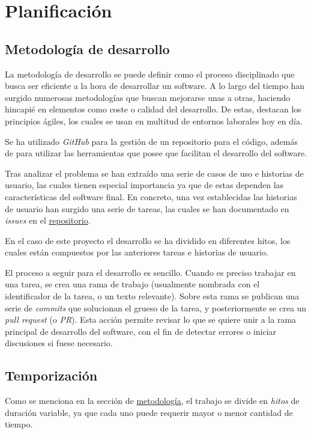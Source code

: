 \chapter{Planificación}

\section{Metodología de desarrollo}
\label{sec:metodologia}

La metodología de desarrollo se puede definir como el proceso disciplinado que busca ser eficiente a la hora de desarrollar un software. A lo largo del tiempo han surgido numerosas metodologías que buscan mejorarse unas a otras, haciendo hincapié en elementos como coste o calidad del desarrollo. De estas, destacan los principios ágiles, los cuales se usan en multitud de entornos laborales hoy en día.

Se ha utilizado \textit{GitHub} para la gestión de un repositorio para el código, además de para utilizar las herramientas que posee que facilitan el desarrollo del software.

Tras analizar el problema se han extraído una serie de casos de uso e historias de usuario, las cuales tienen especial importancia ya que de estas dependen las características del software final. En concreto, una vez establecidas las historias de usuario han surgido una serie de tareas, las cuales se han documentado en \textit{issues} en el \href{https://github.com/harvestcore/matroos}{repositorio}.

En el caso de este proyecto el desarrollo se ha dividido en diferentes hitos, los cuales están compuestos por las anteriores tareas e historias de usuario.

El proceso a seguir para el desarrollo es sencillo. Cuando es preciso trabajar en una tarea, se crea una rama de trabajo (usualmente nombrada con el identificador de la tarea, o un texto relevante). Sobre esta rama se publican una serie de \textit{commits} que solucionan el grueso de la tarea, y posteriormente se crea un \textit{pull request} (o \textit{PR}). Esta acción permite revisar lo que se quiere unir a la rama principal de desarrollo del software, con el fin de detectar errores o iniciar discusiones si fuese necesario.

\section{Temporización}

Como se menciona en la sección de \hyperref[sec:metodologia]{metodología}, el trabajo se divide en \textit{hitos} de duración variable, ya que cada uno puede requerir mayor o menor cantidad de tiempo.

